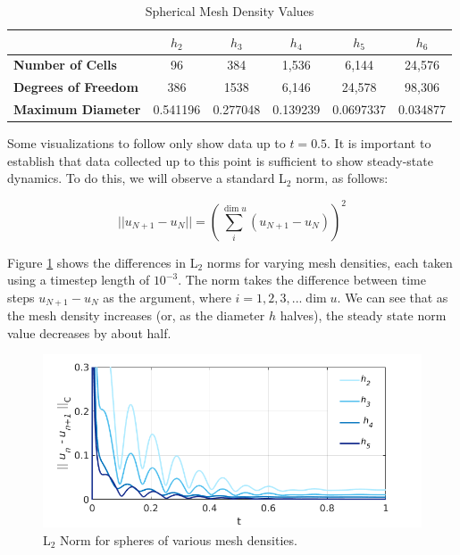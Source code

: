 \documentclass[12pt]{article}
\begin{document}
\begin{table}[H]
	\centering
	\caption{Spherical Mesh Density Values}\label{tab:refine}
	\begin{tabular}{|l|c|c|c|c|c|}
		\hline
		\textbf{}                   & $h_2$    & $h_3$    & $h_4$    & $h_5$     & $h_6$   \\ \hline
		\textbf{Number of Cells}    & 96       & 384      & 1,536    & 6,144     & 24,576\\ \hline
		\textbf{Degrees of Freedom} & 386      & 1538     & 6,146    & 24,578    & 98,306\\ \hline
		\textbf{Maximum Diameter}   & 0.541196 & 0.277048 & 0.139239 & 0.0697337 & 0.034877\\ \hline
	\end{tabular}
\end{table}

Some visualizations to follow only show data up to $t=0.5$. It is important to establish that data collected up to this point is sufficient to show steady-state dynamics. To do this, we will observe a standard L$_2$ norm, as follows:

\begin{equation}\label{eq:norm_standard}
	||u_{N+1} - u_{N}|| = \left(\sum_i^{\dim{u}} (u_{N+1} - u_{N})\right)^2
\end{equation}

Figure \ref{fig:steady-state-h} shows the differences in L$_2$ norms for varying mesh densities, each taken using a timestep length of $10^{-3}$. The norm takes the difference between time steps $u_{N+1}-u_{N}$ as the argument, where $i=1,2,3,...\dim{u}$. We can see that as the mesh density increases (or, as the diameter $h$ halves), the steady state norm value decreases by about half.

\begin{figure}[H]
	\includegraphics[width=\linewidth]{images/norm_numeric.png}
	\caption{L$_2$ Norm for spheres of various mesh densities.}\label{fig:steady-state-h}
\end{figure}
\end{document}
